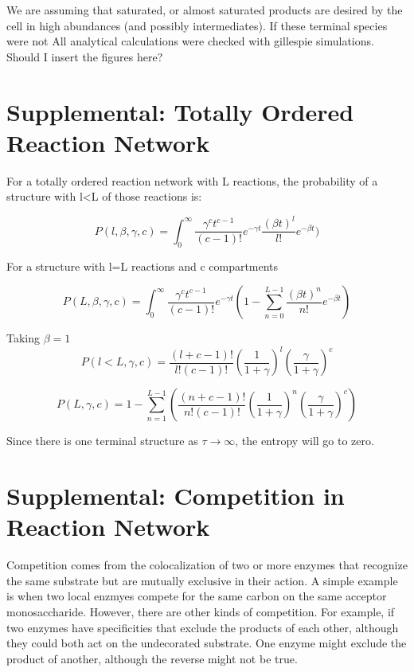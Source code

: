 \documentclass{article}
\begin{document}
We are assuming that saturated, or almost saturated products are desired by the cell in high abundances (and possibly intermediates). If these terminal species were not   All analytical calculations were checked with gillespie simulations. Should I insert the figures here?

\section*{Supplemental: Totally Ordered Reaction Network}

For a totally ordered reaction network with L reactions, the probability of a structure with l<L of those reactions is:

\begin{equation} 
P(l,\beta,\gamma,c)=\int_0^\infty \frac{\gamma^ct^{c-1}}{(c-1)!}e^{-\gamma t}\frac{(\beta t)^l}{l!}e^{-\beta t})
\end{equation}

For a structure with l=L reactions and c compartments

\begin{equation}
P(L,\beta,\gamma,c)=\int_0^\infty \frac{\gamma^ct^{c-1}}{(c-1)!}e^{-\gamma t}(1-\sum_{n=0}^{L-1}\frac{(\beta t)^n}{n!}e^{-\beta t})
\end{equation}

Taking $\beta = 1$
\begin{equation}
P(l<L,\gamma,c)=\frac{(l+c-1)!}{l!(c-1)!}(\frac{1}{1+\gamma})^l(\frac{\gamma}{1+\gamma})^c
\end{equation}

\begin{equation}
P(L,\gamma,c)=1-\sum_{n=1}^{L-1}(\frac{(n+c-1)!}{n!(c-1)!}(\frac{1}{1+\gamma})^n(\frac{\gamma}{1+\gamma})^c)
\end{equation}

Since there is one terminal structure as $\tau \rightarrow\infty$, the entropy will go to zero. 

\section*{Supplemental: Competition in Reaction Network}
Competition comes from the colocalization of two or more enzymes that recognize the same substrate but are mutually exclusive in their action. A simple example is when two local enzmyes compete for the same carbon on the same acceptor monosaccharide. However, there are other kinds of competition. For example, if two enzymes have specificities that exclude the products of each other, although they could both act on the undecorated substrate. One enzyme might exclude the product of another, although the reverse might not be true. 
\end{document}
